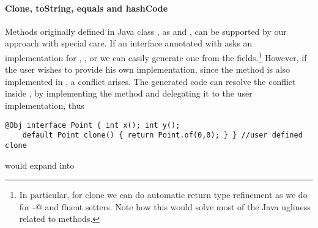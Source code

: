 \begin{comment}
\subsection{Class Invariants in ClassLess Java}
Since objects are created by automatically generated methods, another limitation
of our current approach is that there is no place where the user can dynamically
check for class invariants. In Java often we see code like
\begin{lstlisting}
class Point{ int x; int y;
  Point(int x; int y){this.x=x;this.y=y; assert this.checkInvariant();}
  private boolean checkInvariant(){... x>0,y>0...}
}
\end{lstlisting} 

We are considering an extension of our annotation where 
default methods with the special name \Q@checkInvariant()@ will be called inside the \Q@of@ methods.
If multiple interfaces are implemented, and more then one offers
\Q@checkInvariant()@,  a composed implementation could be automatically generated, composing by \Q@&&@ the various competing implementations.
\end{comment}

\paragraph{Clone, toString, equals and hashCode}
Methods originally defined in Java class \Q@Object@, as \Q@clone@ and
\Q@toString@, can be supported by our approach with special care. If an
interface annotated with \mixin asks an implementation for \Q@clone@,
\Q@toString@, \Q@equals@ or \Q@hashCode@ we can easily generate one from the
fields.\footnote{In particular, for clone we can do automatic return type
  refinement as we do for \Q@with-@ and fluent setters. Note how this would
  solve most of the Java ugliness related to \Q@clone@ methods.}  However, if
the user wishes to provide his own implementation, since the method is also
implemented in \Q@Object@, a conflict arises. The generated code can resolve the
conflict inside \Q@of@, by implementing the method and delegating it to the user
implementation, thus

\begin{lstlisting}
@Obj interface Point { int x(); int y();
    default Point clone() { return Point.of(0,0); } } //user defined clone
\end{lstlisting} 
would expand into 

